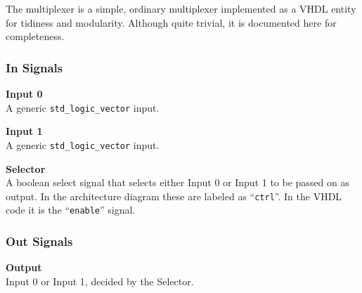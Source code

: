 The multiplexer is a simple, ordinary multiplexer implemented as a VHDL entity for tidiness and modularity.
Although quite trivial, it is documented here for completeness.

\subsubsection{In Signals}

\begin{description}
\item{\textbf{Input 0}} \\

A generic \texttt{std\_logic\_vector} input.

\item{\textbf{Input 1}} \\

A generic \texttt{std\_logic\_vector} input.

\item{\textbf{Selector}} \\

A boolean select signal that selects either Input 0 or Input 1 to be passed on as output.
In the architecture diagram these are labeled as ``\texttt{ctrl}''. 
In the VHDL code it is the ``\texttt{enable}'' signal.

\end{description}

\subsubsection{Out Signals}

\begin{description}
\item{\textbf{Output}} \\

Input 0 or Input 1, decided by the Selector.

\end{description}
